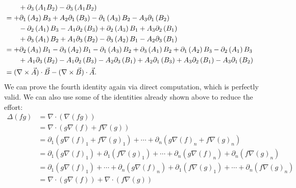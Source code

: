 \documentclass[11pt]{article}
\begin{document}
\begin{solution}
\begin{align*}
        \\&\qquad
        + \partial_3\left( A_1 B_2 \right) - \partial_3\left( A_1 B_2 \right)
        \\&=
        + \partial_1\left( A_2 \right) B_3 + A_2 \partial_1\left( B_3 \right) - \partial_1\left( A_3 \right) B_2 - A_3 \partial_1\left( B_2 \right) 
        \\&\qquad
        - \partial_2\left( A_1 \right) B_3 - A_1 \partial_2\left( B_3 \right) + \partial_2\left( A_3 \right) B_1 + A_3 \partial_2\left( B_1 \right) 
        \\&\qquad
        + \partial_3\left( A_1 \right) B_2 + A_1 \partial_3\left( B_2 \right) - \partial_3\left( A_2 \right) B_1 - A_2 \partial_3\left( B_1 \right)
        \\&=
         + \partial_2\left( A_3 \right) B_1 - \partial_3\left( A_2 \right) B_1 
         - \partial_1\left( A_3 \right) B_2 + \partial_3\left( A_1 \right) B_2
         + \partial_1\left( A_2 \right) B_3 - \partial_2\left( A_1 \right) B_3 
        \\&\qquad
         + A_1 \partial_3\left( B_2 \right) - A_1 \partial_2\left( B_3 \right)
         - A_2 \partial_3\left( B_1 \right) + A_2 \partial_1\left( B_3 \right) 
         + A_3 \partial_2\left( B_1 \right) - A_3 \partial_1\left( B_2 \right) 
        \\&=
        ( \nabla\times\vec{A} ) \cdot \vec{B} - ( \nabla\times\vec{B} ) \cdot \vec{A}
        .
    \end{align*}
    We can prove the fourth identity again via direct computation, which is perfectly valid. 
    We can also use some of the identities already shown above to reduce the effort:
    \begin{align*}
        \Delta ( f g )
        &= 
        \nabla \cdot ( \nabla ( f g ) )
        \\&= 
        \nabla \cdot ( g \nabla(f) + f \nabla(g) )
        \\&= 
        \partial_1( g \nabla(f)_1 + f \nabla(g)_1 ) + \cdots + \partial_n( g \nabla(f)_n + f \nabla(g)_n )
        \\&= 
        \partial_1( g \nabla(f)_1 ) + \partial_1( f \nabla(g)_1 ) + \cdots + \partial_n( g \nabla(f)_n ) + \partial_n( f \nabla(g)_n )
        \\&= 
        \partial_1( g \nabla(f)_1 ) + \cdots + \partial_n( g \nabla(f)_n ) + \partial_1( f \nabla(g)_1 ) + \cdots + \partial_n( f \nabla(g)_n )
        \\&= 
        \nabla \cdot ( g \nabla(f) ) + \nabla \cdot ( f \nabla(g) )

\end{align*}
\end{solution}
\end{document}
